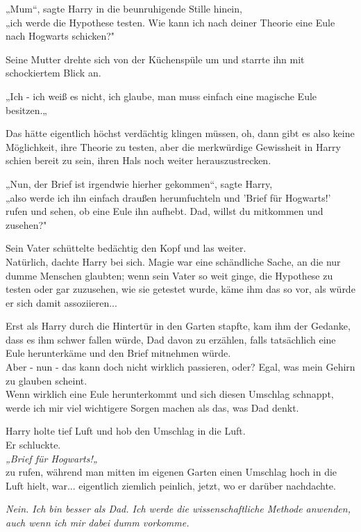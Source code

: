 {„Mum“, sagte Harry in die beunruhigende Stille hinein,\\ „ich werde die Hypothese testen. Wie kann ich nach deiner Theorie eine Eule nach Hogwarts schicken?"

Seine Mutter drehte sich von der Küchenspüle um und starrte ihn mit schockiertem Blick an.

„Ich - ich weiß es nicht, ich glaube, man muss einfach eine magische Eule besitzen.„

Das hätte eigentlich höchst verdächtig klingen müssen, oh, dann gibt es also keine Möglichkeit, ihre Theorie zu testen, aber die merkwürdige Gewissheit in Harry schien bereit zu sein, ihren Hals noch weiter herauszustrecken.

„Nun, der Brief ist irgendwie hierher gekommen“, sagte Harry,\\ „also werde ich ihn einfach draußen herumfuchteln und 'Brief für Hogwarts!' rufen und sehen, ob eine Eule ihn aufhebt. Dad, willst du mitkommen und zusehen?"

Sein Vater schüttelte bedächtig den Kopf und las weiter.\\ Natürlich, dachte Harry bei sich. Magie war eine schändliche Sache, an die nur dumme Menschen glaubten; wenn sein Vater so weit ginge, die Hypothese zu testen oder gar zuzusehen, wie sie getestet wurde, käme ihm das so vor, als würde er sich damit assoziieren...

Erst als Harry durch die Hintertür in den Garten stapfte, kam ihm der Gedanke, dass es ihm schwer fallen würde, Dad davon zu erzählen, falls tatsächlich eine Eule herunterkäme und den Brief mitnehmen würde.\\ Aber - nun - das kann doch nicht wirklich passieren, oder? Egal, was mein Gehirn zu glauben scheint.\\ Wenn wirklich eine Eule herunterkommt und sich diesen Umschlag schnappt, werde ich mir viel wichtigere Sorgen machen als das, was Dad denkt.

Harry holte tief Luft und hob den Umschlag in die Luft.\\ Er schluckte.\\ \emph{„Brief für Hogwarts!„}\\ zu rufen, während man mitten im eigenen Garten einen Umschlag hoch in die Luft hielt, war... eigentlich ziemlich peinlich, jetzt, wo er darüber nachdachte.

\emph{Nein. Ich bin besser als Dad. Ich werde die wissenschaftliche Methode anwenden, auch wenn ich mir dabei dumm vorkomme.}

}
